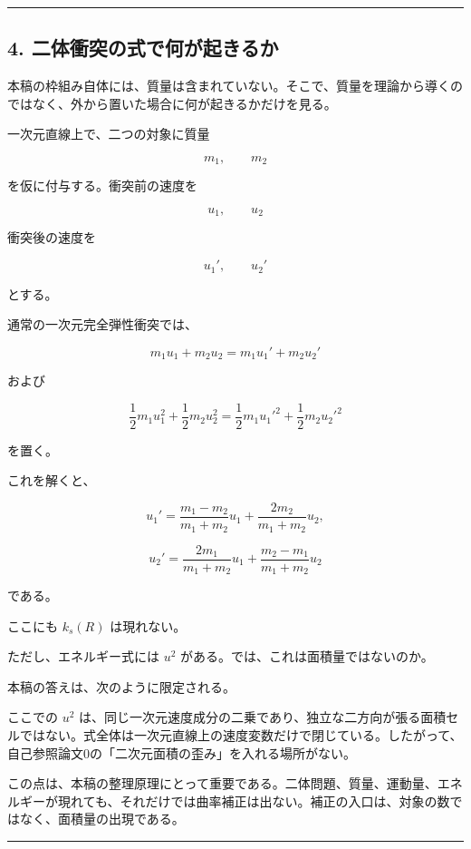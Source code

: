 \documentclass[
]{ltjsarticle}
\begin{document}
\begin{center}\rule{0.5\linewidth}{0.5pt}\end{center}

\subsection{4.
二体衝突の式で何が起きるか}\label{ux4e8cux4f53ux885dux7a81ux306eux5f0fux3067ux4f55ux304cux8d77ux304dux308bux304b}

本稿の枠組み自体には、質量は含まれていない。そこで、質量を理論から導くのではなく、外から置いた場合に何が起きるかだけを見る。

一次元直線上で、二つの対象に質量

\[
m_1,\qquad m_2
\]

を仮に付与する。衝突前の速度を

\[
u_1,\qquad u_2
\]

衝突後の速度を

\[
u_1',\qquad u_2'
\]

とする。

通常の一次元完全弾性衝突では、

\[
m_1u_1+m_2u_2=m_1u_1'+m_2u_2'
\]

および

\[
\frac{1}{2}m_1u_1^2+\frac{1}{2}m_2u_2^2
=
\frac{1}{2}m_1{u_1'}^2+\frac{1}{2}m_2{u_2'}^2
\]

を置く。

これを解くと、

\[
u_1'
=
\frac{m_1-m_2}{m_1+m_2}u_1
+
\frac{2m_2}{m_1+m_2}u_2,
\]

\[
u_2'
=
\frac{2m_1}{m_1+m_2}u_1
+
\frac{m_2-m_1}{m_1+m_2}u_2
\]

である。

ここにも \(k_s(R)\) は現れない。

ただし、エネルギー式には \(u^2\)
がある。では、これは面積量ではないのか。

本稿の答えは、次のように限定される。

ここでの \(u^2\)
は、同じ一次元速度成分の二乗であり、独立な二方向が張る面積セルではない。式全体は一次元直線上の速度変数だけで閉じている。したがって、自己参照論文0の「二次元面積の歪み」を入れる場所がない。

この点は、本稿の整理原理にとって重要である。二体問題、質量、運動量、エネルギーが現れても、それだけでは曲率補正は出ない。補正の入口は、対象の数ではなく、面積量の出現である。

\begin{center}\rule{0.5\linewidth}{0.5pt}\end{center}
\end{document}
